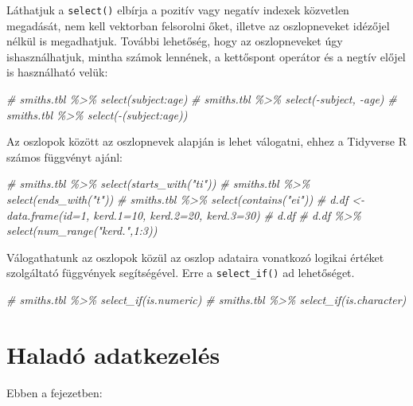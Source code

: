 \documentclass[
]{book}
\makeatletter
\newenvironment{Shaded}{\begin{snugshade}}{\end{snugshade}}
\newcommand{\CommentTok}[1]{\textcolor[rgb]{0.56,0.35,0.01}{\textit{#1}}}
\newenvironment{kframe}{%
\medskip{}
\setlength{\fboxsep}{.8em}
 \def\at@end@of@kframe{}%
 \ifinner\ifhmode%
  \def\at@end@of@kframe{\end{minipage}}%
  \begin{minipage}{\columnwidth}%
 \fi\fi%
 \def\FrameCommand##1{\hskip\@totalleftmargin \hskip-\fboxsep
 \colorbox{shadecolor}{##1}\hskip-\fboxsep
     \hskip-\linewidth \hskip-\@totalleftmargin \hskip\columnwidth}%
 \MakeFramed {\advance\hsize-\width
   \@totalleftmargin\z@ \linewidth\hsize
   \@setminipage}}%
 {\par\unskip\endMakeFramed%
 \at@end@of@kframe}
\newenvironment{rmdblock}[1]
  {
  \begin{itemize}
  \renewcommand{\labelitemi}{
    \raisebox{-.7\height}[0pt][0pt]{
      {\setkeys{Gin}{width=3em,keepaspectratio}\texttt{[image: images/\#1]}}
    }
  }
  \setlength{\fboxsep}{1em}
  \begin{kframe}
  \item
  }
  {
  \end{kframe}
  \end{itemize}
  }
\newenvironment{rmdlevel3}
  {\begin{rmdblock}{level3}}
  {\end{rmdblock}}
\makeatother
\begin{document}
Láthatjuk a \texttt{select()} elbírja a pozitív vagy negatív indexek közvetlen megadását, nem kell vektorban felsorolni őket, illetve az oszlopneveket idézőjel nélkül is megadhatjuk.
További lehetőség, hogy az oszlopneveket úgy ishasználhatjuk, mintha számok lennének, a kettőspont operátor és a negtív előjel is használható velük:

\begin{Shaded}
\begin{Highlighting}[]
\CommentTok{\# smiths.tbl \%\textgreater{}\% select(subject:age)}
\CommentTok{\# smiths.tbl \%\textgreater{}\% select({-}subject, {-}age)}
\CommentTok{\# smiths.tbl \%\textgreater{}\% select({-}(subject:age))}
\end{Highlighting}
\end{Shaded}

Az oszlopok között az oszlopnevek alapján is lehet válogatni, ehhez a Tidyverse R számos függvényt ajánl:

\begin{Shaded}
\begin{Highlighting}[]
\CommentTok{\# smiths.tbl \%\textgreater{}\% select(starts\_with("ti"))}
\CommentTok{\# smiths.tbl \%\textgreater{}\% select(ends\_with("t"))}
\CommentTok{\# smiths.tbl \%\textgreater{}\% select(contains("ei"))}
\CommentTok{\# d.df \textless{}{-} data.frame(id=1, kerd.1=10, kerd.2=20, kerd.3=30)}
\CommentTok{\# d.df}
\CommentTok{\# d.df \%\textgreater{}\% select(num\_range("kerd.",1:3))}
\end{Highlighting}
\end{Shaded}

Válogathatunk az oszlopok közül az oszlop adataira vonatkozó logikai értéket szolgáltató függvények segítségével. Erre a \texttt{select\_if()} ad lehetőséget.

\begin{Shaded}
\begin{Highlighting}[]
\CommentTok{\# smiths.tbl \%\textgreater{}\% select\_if(is.numeric)}
\CommentTok{\# smiths.tbl \%\textgreater{}\% select\_if(is.character)}
\end{Highlighting}
\end{Shaded}

\hypertarget{haladuxf3-adatkezeluxe9s}{%
\section{Haladó adatkezelés}\label{haladuxf3-adatkezeluxe9s}}

\begin{rmdlevel3}
Ebben a fejezetben:
\end{rmdlevel3}
\end{document}
